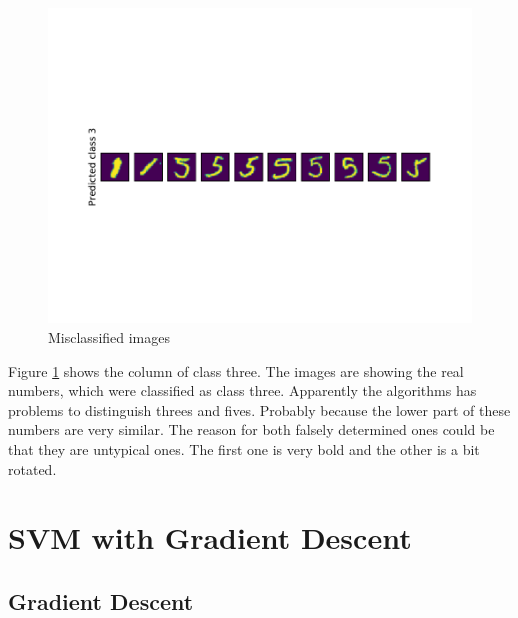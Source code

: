 \documentclass{article}
\begin{document}
\begin{figure}[!ht]
	\centering
	\includegraphics[width=\textwidth]{./Figures/3b_misclassifieditems.pdf}
	\caption{Misclassified images}
	\label{mnist_misclassified}
\end{figure}

Figure \ref{mnist_misclassified} shows the column of class three. The images are showing the real numbers, which were classified as class three. Apparently the algorithms has problems to distinguish threes and fives. Probably because the lower part of these numbers are very similar. The reason for both falsely determined ones could be that they are untypical ones. The first one is very bold and the other is a bit rotated.

\clearpage
\section{SVM with Gradient Descent}

\subsection{Gradient Descent}
\end{document}
